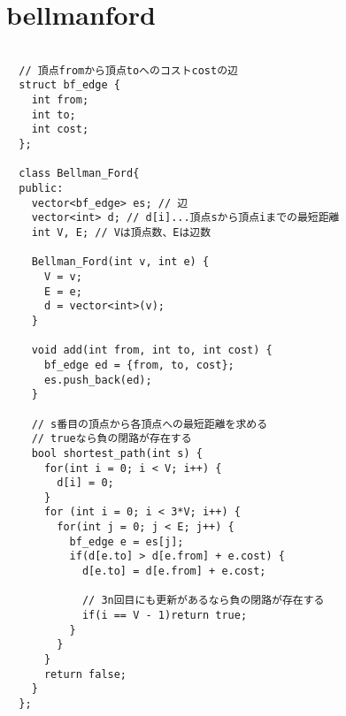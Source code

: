 \documentclass{jsarticle}
\begin{document}
\section{bellmanford}
\color{black}
\begin{lstlisting}[caption=bellmanford]

  // 頂点fromから頂点toへのコストcostの辺
  struct bf_edge {
    int from;
    int to;
    int cost;
  };
  
  class Bellman_Ford{
  public:
    vector<bf_edge> es; // 辺
    vector<int> d; // d[i]...頂点sから頂点iまでの最短距離
    int V, E; // Vは頂点数、Eは辺数
  
    Bellman_Ford(int v, int e) {
      V = v;
      E = e;
      d = vector<int>(v);
    }
  
    void add(int from, int to, int cost) {
      bf_edge ed = {from, to, cost};
      es.push_back(ed);
    }
  
    // s番目の頂点から各頂点への最短距離を求める
    // trueなら負の閉路が存在する
    bool shortest_path(int s) {
      for(int i = 0; i < V; i++) {
        d[i] = 0;
      }
      for (int i = 0; i < 3*V; i++) {
        for(int j = 0; j < E; j++) {
          bf_edge e = es[j];
          if(d[e.to] > d[e.from] + e.cost) {
            d[e.to] = d[e.from] + e.cost;
  
            // 3n回目にも更新があるなら負の閉路が存在する
            if(i == V - 1)return true;
          }
        }
      }
      return false;
    }
  };
  

\end{lstlisting}

\color{white}
\end{document}
